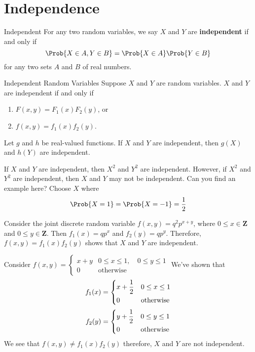 \section{Independence}
\begin{Definition}{Independent}{}
    For any two random variables, we say $ X $ and $ Y $
    are \textbf{independent} if and only if
    \[ \Prob{X\in A,Y\in B}=\Prob{X\in A} \Prob{Y\in B} \]
    for any two sets $ A $ and $ B $ of real numbers.
\end{Definition}

\begin{Theorem}{Independent Random Variables}{}
    Suppose $ X $ and $ Y $ are random variables. $ X $
    and $ Y $ are independent if and only if
    \begin{enumerate}[label=(\arabic*)]
        \item $ F(x,y)=F_1(x)F_2(y) $, or
        \item $ f(x,y)=f_1(x)f_2(y) $.
    \end{enumerate}
\end{Theorem}

\begin{Theorem}{}{}
    Let $ g $ and $ h $ be real-valued functions.
    If $ X $ and $ Y $ are independent,
    then $ g(X) $ and $ h(Y) $ are independent.
\end{Theorem}

\begin{Example}{}{}
    If $ X $ and $ Y $ are independent,
    then $ X^2 $ and $ Y^2 $ are independent. However,
    if $ X^2 $ and $ Y^2 $ are independent, then $ X $
    and $ Y $ may not be independent. Can you find an example here?
    Choose $ X $ where
    \[ \Prob{X=1}
        =\Prob{X=-1}=\frac{1}{2} \]
\end{Example}

\begin{Example}{}{}
    Consider the joint discrete random variable
    $ f(x,y)=q^2 p^{x+y} $, where $ 0\le x\in\mathbf{Z} $
    and $ 0\le y\in\mathbf{Z} $. Then $ f_1(x)=qp^x $
    and $ f_2(y)=qp^y $. Therefore,
    $ f(x,y)=f_1(x)f_2(y) $
    shows that $ X $ and $ Y $ are independent.

    Consider $ \displaystyle
        f(x,y)=\begin{cases}
            x+y & 0\le x\le 1,\quad 0\le y\le 1 \\
            0   & \text{otherwise}
        \end{cases} $
    We've shown that
    \[ f_1(x)=\begin{dcases}
            x+\frac{1}{2} & 0\le x\le 1      \\
            0             & \text{otherwise}
        \end{dcases} \]
    \[ f_2(y)=\begin{dcases}
            y+\frac{1}{2} & 0\le y\le 1      \\
            0             & \text{otherwise}
        \end{dcases} \]
    We see that $ f(x,y)\neq f_1(x)f_2(y) $
    therefore, $ X $ and $ Y $ are not independent.
\end{Example}

